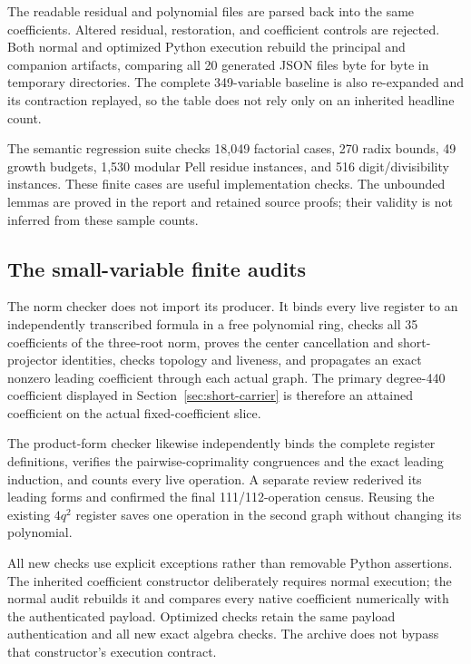 The readable residual and polynomial files are parsed back into the
same coefficients. Altered residual, restoration, and coefficient controls
are rejected. Both normal and optimized Python execution rebuild the
principal and companion artifacts, comparing all 20 generated JSON
files byte for byte in temporary directories. The complete 349-variable
baseline is also re-expanded and its contraction replayed, so the table
does not rely only on an inherited headline count.

The semantic regression suite checks 18,049 factorial cases, 270 radix
bounds, 49 growth budgets, 1,530 modular Pell residue instances, and 516
digit/divisibility instances. These finite cases are useful implementation
checks. The unbounded lemmas are proved in the report and retained source
proofs; their validity is not inferred from these sample counts.

\subsection{The small-variable finite audits}
The norm checker does not import its producer. It binds every live
register to an independently transcribed formula in a free polynomial
ring, checks all 35 coefficients of the three-root norm, proves the
center cancellation and short-projector identities, checks topology and
liveness, and propagates an exact nonzero leading coefficient through
each actual graph. The primary degree-440 coefficient displayed in
Section~\ref{sec:short-carrier} is therefore an attained coefficient on
the actual fixed-coefficient slice.

The product-form checker likewise independently binds the complete
register definitions, verifies the pairwise-coprimality congruences and
the exact leading induction, and counts every live operation. A separate
review rederived its leading forms and confirmed the final
111/112-operation census. Reusing the existing $4q^2$ register saves
one operation in the second graph without changing its polynomial.

All new checks use explicit exceptions rather than removable Python
assertions. The inherited coefficient constructor deliberately requires
normal execution; the normal audit rebuilds it and compares every native
coefficient numerically with the authenticated payload. Optimized checks
retain the same payload authentication and all new exact algebra checks.
The archive does not bypass that constructor's execution contract.

